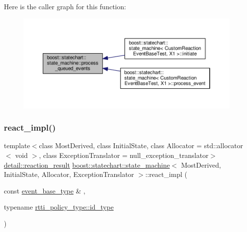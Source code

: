 Here is the caller graph for this function\+:
\nopagebreak
\begin{figure}[H]
\begin{center}
\leavevmode
\includegraphics[width=350pt]{classboost_1_1statechart_1_1state__machine_af158f951f31691cdec6c00b48612124c_icgraph}
\end{center}
\end{figure}
\mbox{\label{classboost_1_1statechart_1_1state__machine_ade128c9521e56191502b711f15b438cd}} 
\subsubsection{\texorpdfstring{react\+\_\+impl()}{react\_impl()}}
{\footnotesize\ttfamily template$<$class Most\+Derived, class Initial\+State, class Allocator = std\+::allocator$<$ void $>$, class Exception\+Translator = null\+\_\+exception\+\_\+translator$>$ \\
\mbox{\hyperlink{namespaceboost_1_1statechart_1_1detail_ab091bbb4c29327fb46ee479ea1b7255b}{detail\+::reaction\+\_\+result}} \mbox{\hyperlink{classboost_1_1statechart_1_1state__machine}{boost\+::statechart\+::state\+\_\+machine}}$<$ Most\+Derived, Initial\+State, Allocator, Exception\+Translator $>$\+::react\+\_\+impl (\begin{DoxyParamCaption}\item[{const \mbox{\hyperlink{classboost_1_1statechart_1_1state__machine_adb0e98d6d780a0977209fa7389b20bcd}{event\+\_\+base\+\_\+type}} \&}]{,  }\item[{typename \mbox{\hyperlink{structboost_1_1statechart_1_1detail_1_1rtti__policy_a57d56a3531686fb2b92d733b5da620c2}{rtti\+\_\+policy\+\_\+type\+::id\+\_\+type}}}]{ }\end{DoxyParamCaption})\hspace{0.3cm}{\ttfamily [inline]}}

